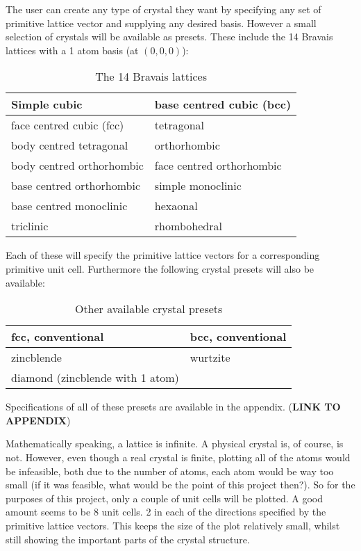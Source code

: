 \documentclass[a4paper,10pt]{article}
\numberwithin{equation}{section}
\begin{document}
	The user can create any type of crystal they want by specifying any set of primitive lattice vector and supplying any desired basis. However a small selection of crystals will be available as presets. These include the 14 Bravais lattices with a 1 atom basis (at $ (0,0,0) $):
	\begin{table}
		\centering
		\begin{tabular}{|l|l|}
			\hline
			Simple cubic & base centred cubic (bcc) \\
			\hline
			face centred cubic (fcc) & tetragonal \\
			\hline
			body centred tetragonal & orthorhombic \\
			\hline
			body centred orthorhombic & face centred orthorhombic \\
			\hline
			base centred orthorhombic & simple monoclinic \\
			\hline
			base centred monoclinic & hexaonal \\
			\hline
			triclinic & rhombohedral \\
			\hline
		\end{tabular}
		\caption{The 14 Bravais lattices}
		\label{tab:bravais}
	\end{table}
	
	Each of these will specify the primitive lattice vectors for a corresponding primitive unit cell. Furthermore the following crystal presets will also be available:
	\begin{table}
		\centering
		\begin{tabular}{|l|l|}
			\hline
			fcc, conventional & bcc, conventional \\
			\hline
			zincblende & wurtzite \\
			\hline
			diamond (zincblende with 1 atom) & \\
			\hline
		\end{tabular}
		\caption{Other available crystal presets}
		\label{tab:presets}
	\end{table}
	Specifications of all of these presets are available in the appendix. (\textbf{LINK TO APPENDIX})

	Mathematically speaking, a lattice is infinite. A physical crystal is, of course, is not. However, even though a real crystal is finite, plotting all of the atoms would be infeasible, both due to the number of atoms, each atom would be way too small (if it was feasible, what would be the point of this project then?). So for the purposes of this project, only a couple of unit cells will be plotted. A good amount seems to be 8 unit cells. 2 in each of the directions specified by the primitive lattice vectors. This keeps the size of the plot relatively small, whilst still showing the important parts of the crystal structure.
	
\end{document}
